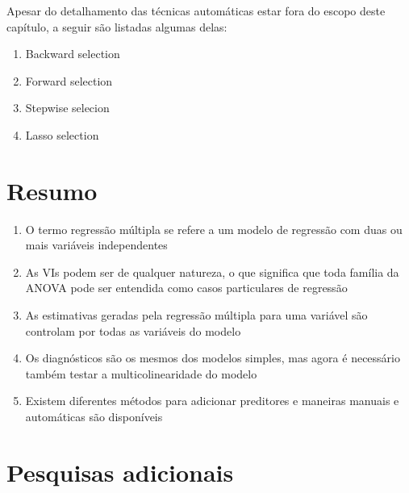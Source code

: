 \documentclass[
]{book}
\providecommand{\tightlist}{%
  \setlength{\itemsep}{0pt}\setlength{\parskip}{0pt}}
\newenvironment{explore}{
  \definecolor{shadecolor}{rgb}{0, 0, 0}  %
  \color{white}
  \begin{shaded}}
 {\end{shaded}}
\begin{document}
Apesar do detalhamento das técnicas automáticas estar fora do escopo deste capítulo, a seguir são listadas algumas delas:

\begin{enumerate}
\def\labelenumi{\arabic{enumi}.}
\tightlist
\item
  Backward selection\\
\item
  Forward selection\\
\item
  Stepwise selecion\\
\item
  Lasso selection
\end{enumerate}

\hypertarget{resumo-10}{%
\section{Resumo}\label{resumo-10}}

\begin{explore}

\begin{enumerate}
\def\labelenumi{\arabic{enumi}.}
\tightlist
\item
  O termo regressão múltipla se refere a um modelo de regressão com duas ou mais variáveis independentes\\
\item
  As VIs podem ser de qualquer natureza, o que significa que toda família da ANOVA pode ser entendida como casos particulares de regressão
\item
  As estimativas geradas pela regressão múltipla para uma variável são controlam por todas as variáveis do modelo\\
\item
  Os diagnósticos são os mesmos dos modelos simples, mas agora é necessário também testar a multicolinearidade do modelo\\
\item
  Existem diferentes métodos para adicionar preditores e maneiras manuais e automáticas são disponíveis\\
\end{enumerate}

\end{explore}

\hypertarget{pesquisas-adicionais-5}{%
\section{Pesquisas adicionais}\label{pesquisas-adicionais-5}}
\end{document}
